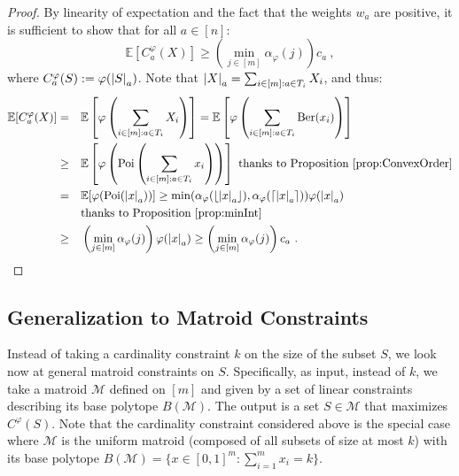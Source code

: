 \begin{proof}
  By linearity of expectation and the fact that the weights $w_a$ are positive, it is sufficient to show that for all $a \in [n]$:
  \[ \mathbb{E}[C_a^{\varphi}(X)] \geq \left(\min_{j \in [m]} \alpha_{\varphi}(j) \right) c_a \ , \]
 where $C_a^{\varphi}(S) := \varphi(\abs{S}_a)$. Note that $\abs{X}_a = \sum_{i \in [m] : a \in T_i} X_i$, and thus:
  \begin{equation}
    \begin{aligned}
      \mathbb{E}[C_a^{\varphi}(X)] &=&& \mathbb{E}\left[\varphi\left(\sum_{i \in [m] : a \in T_i} X_i\right)\right] = \mathbb{E}\left[\varphi\left(\sum_{i \in [m] : a \in T_i}\operatorname{\text{Ber}}(x_i) \right)\right]\\
      &\geq&& \mathbb{E}\left[\varphi\left(\operatorname{\text{Poi}}\left(\sum_{i \in [m] : a \in T_i} x_i\right)\right)\right] \text{ thanks to Proposition~\ref{prop:ConvexOrder}}\\
      &=&& \mathbb{E}[\varphi(\operatorname{\text{Poi}}(\abs{x}_a))] \geq \min(\alpha_{\varphi}(\lfloor \abs{x}_a \rfloor), \alpha_{\varphi}(\lceil \abs{x}_a \rceil)) \varphi(\abs{x}_a)\\
      &\quad&& \text{thanks to Proposition~\ref{prop:minInt}}\\
      &\geq&& \left(\min_{j \in [m]} \alpha_{\varphi}(j) \right) \varphi(\abs{x}_a) \geq \left(\min_{j \in [m]} \alpha_{\varphi}(j) \right) c_a\ .
    \end{aligned}
  \end{equation}

\end{proof}

\subsection{Generalization to Matroid Constraints}
\label{sec:matroid}

Instead of taking a cardinality constraint $k$ on the size of the subset $S$, we look now at general matroid constraints on $S$. Specifically, as input, instead of $k$, we take a matroid $\mathcal{M}$ defined on $[m]$ and given by a set of linear constraints describing its base polytope $B(\mathcal{M})$. The output is a set $S \in \mathcal{M}$ that maximizes $C^{\varphi}(S)$. Note that the cardinality constraint considered above is the special case where $\mathcal{M}$ is the uniform matroid (composed of all subsets of size at most $k$) with its base polytope $B(\mathcal{M}) = \{ x \in [0,1]^m : \sum_{i=1}^m x_i = k\}$.

